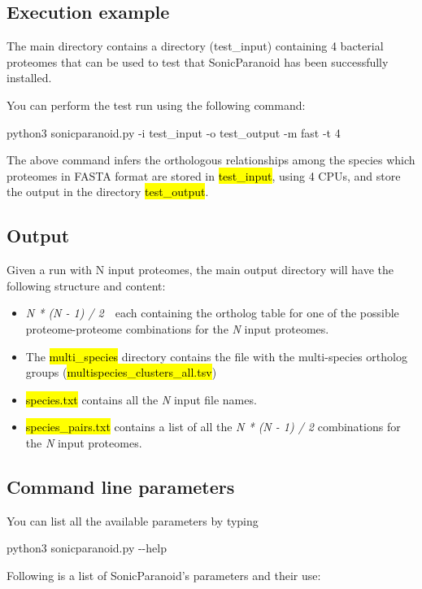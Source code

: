 \documentclass[12pt]{article} %
\begin{document}

\subsection{Execution example} %
The main directory contains a directory (test\_input) containing 4 bacterial proteomes that can be used to test that SonicParanoid has been successfully installed.

\noindent You can perform the test run using the following command:
\begin{mdframed}[backgroundcolor=gray!20]
python3 sonicparanoid.py -i test\_input -o test\_output -m fast -t 4
\end{mdframed}
The above command infers the orthologous relationships among the species which proteomes in FASTA format are stored in \hl{test\_input}, using 4 CPUs, and store the output in the directory \hl{test\_output}.


\subsection{Output} %
Given a run with N input proteomes, the main output directory will have the following structure and content:

\begin{mdframed}[backgroundcolor=blue!20]
\begin{itemize}
  \item \textit{N * (N - 1) / 2}　each containing the ortholog table for one of the possible proteome-proteome combinations for the \textit{N} input proteomes.
  \item The \hl{multi\_species} directory contains the file with the multi-species ortholog groups (\hl{multispecies\_clusters\_all.tsv})
  \item \hl{species.txt} contains all the \textit{N} input file names.
  \item \hl{species\_pairs.txt} contains a list of all the \textit{N * (N - 1) / 2} combinations for the \textit{N} input proteomes.
\end{itemize}
\end{mdframed}


\subsection{Command line parameters} %
You can list all the available parameters by typing
\begin{mdframed}[backgroundcolor=gray!20]
python3 sonicparanoid.py \--\--help
\end{mdframed}
Following is a list of SonicParanoid's parameters and their use:
\end{document}
